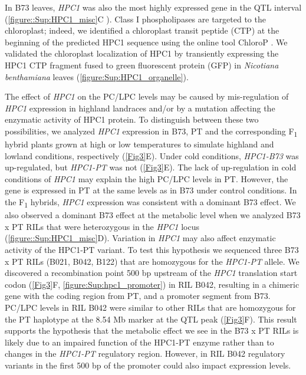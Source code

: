 \documentclass[9pt,twocolumn,twoside,lineno]{biorxiv}
\newcommand{\hpc}{\textit{HPC1}\xspace}
\begin{document}
In B73 leaves, \hpc was also the most highly expressed gene in the QTL interval (\cref{figure::Sup:HPC1_misc}C \cite{Stelpflug2016-vr}).
Class I phospholipases are targeted to the chloroplast; indeed, we identified a chloroplast transit peptide (CTP) at the beginning of the predicted HPC1 sequence using the online tool ChloroP \cite{Emanuelsson1999-rs}.
We validated the chloroplast localization of HPC1 by transiently expressing  the HPC1 CTP fragment fused to green fluorescent protein (GFP) in \textit{Nicotiana benthamiana} leaves (\cref{figure:Sup:HPC1_organelle}).

The effect of \hpc on the PC/LPC levels may be caused by mis-regulation of \hpc expression in highland landraces and/or by a mutation affecting the enzymatic activity of HPC1 protein. 
To distinguish between these two possibilities, we analyzed \hpc expression in B73, PT and the corresponding F\textsubscript{1} hybrid plants grown at high or low temperatures to simulate highland and lowland conditions, respectively (\cref{Fig3}E). 
Under cold conditions, \textit{HPC1-B73} was up-regulated, but \textit{HPC1-PT} was not (\cref{Fig3}E). 
The lack of up-regulation in cold conditions of \hpc may explain the high PC/LPC levels in PT.
However, the gene is expressed in PT at the same levels as in B73 under control conditions.
In the F\textsubscript{1} hybrids, \hpc expression was consistent with a dominant B73 effect.
We also observed a dominant B73 effect at the metabolic level when we analyzed B73 x PT RILs that were heterozygous in the \hpc locus
(\cref{figure::Sup:HPC1_misc}D).
Variation in \hpc may also affect enzymatic activity of the HPC1-PT variant. 
To test this hypothesis we sequenced three B73 x PT RILs (B021, B042, B122) that are homozygous for the \textit{HPC1-PT} allele.
We discovered a recombination point 500 bp upstream of the \hpc translation start codon (\cref{Fig3}F, \cref{figure:Sup:hpc1_promoter}) in RIL B042, resulting in a chimeric gene with the coding region from PT, and a promoter segment from B73.
PC/LPC levels in RIL B042 were similar to other RILs that are homozygous for the PT haplotype at the 8.54 Mb marker at the QTL peak (\cref{Fig3}F). 
This result supports the hypothesis that the metabolic effect we see in the B73 x PT RILs is likely due to an impaired function of the HPC1-PT enzyme rather than to changes in the \textit{HPC1-PT} regulatory region.
However, in RIL B042 regulatory variants in the first 500 bp of the promoter could also impact expression levels.
\end{document}
